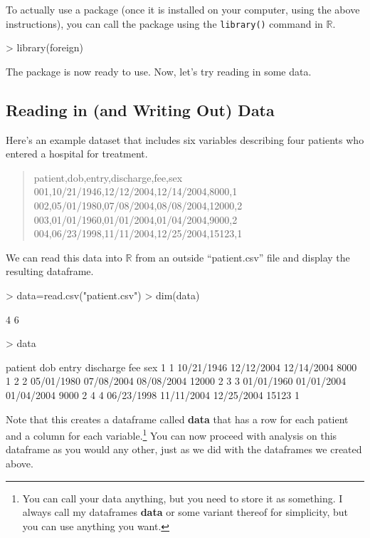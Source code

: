 \documentclass[12pt]{article}
\begin{document}
To actually use a package (once it is installed on your computer, using the above instructions), you can call the package using the \verb|library()| command in $\mathbb{R}$.
\begin{Schunk}
\begin{Sinput}
> library(foreign)
\end{Sinput}
\end{Schunk}
The package is now ready to use. Now, let's try reading in some data.

\subsection{Reading in (and Writing Out) Data}
Here's an example dataset that includes six variables describing four patients who entered a hospital for treatment.
\begin{quote}
patient,dob,entry,discharge,fee,sex\\
001,10/21/1946,12/12/2004,12/14/2004,8000,1\\
002,05/01/1980,07/08/2004,08/08/2004,12000,2\\
003,01/01/1960,01/01/2004,01/04/2004,9000,2\\
004,06/23/1998,11/11/2004,12/25/2004,15123,1\\
\end{quote}
We can read this data into $\mathbb{R}$ from an outside ``patient.csv'' file and display the resulting dataframe.
\begin{Schunk}
\begin{Sinput}
> data=read.csv("patient.csv")
> dim(data)
\end{Sinput}
\begin{Soutput}
[1] 4 6
\end{Soutput}
\begin{Sinput}
> data
\end{Sinput}
\begin{Soutput}
  patient        dob      entry  discharge   fee sex
1       1 10/21/1946 12/12/2004 12/14/2004  8000   1
2       2 05/01/1980 07/08/2004 08/08/2004 12000   2
3       3 01/01/1960 01/01/2004 01/04/2004  9000   2
4       4 06/23/1998 11/11/2004 12/25/2004 15123   1
\end{Soutput}
\end{Schunk}
Note that this creates a dataframe called \textbf{data} that has a row for each patient and a column for each variable.\footnote{You can call your data anything, but you need to store it as something. I always call my dataframes \textbf{data} or some variant thereof for simplicity, but you can use anything you want.} You can now proceed with analysis on this dataframe as you would any other, just as we did with the dataframes we created above.
\end{document}
